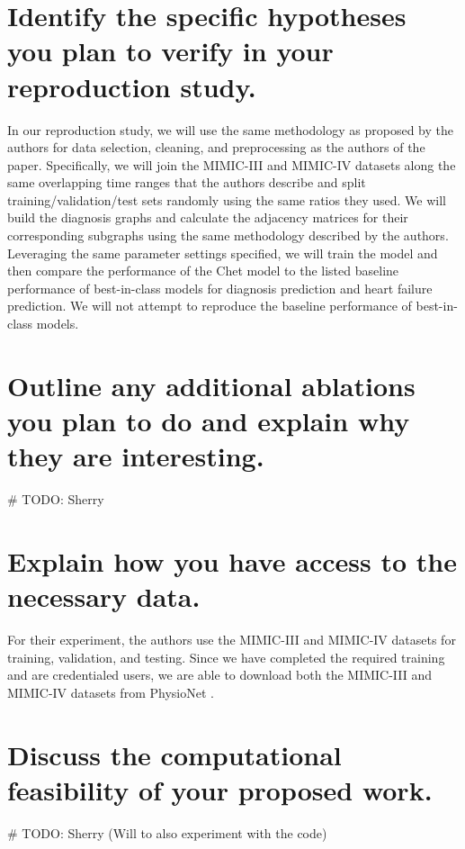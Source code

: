 \documentclass[11pt,a4paper]{article}
\begin{document}
\section{Identify the specific hypotheses you plan to verify in your
reproduction study.}
In our reproduction study, we will use the same methodology as proposed by the
authors for data selection, cleaning, and preprocessing as the authors of the
paper. Specifically, we will join the MIMIC-III and MIMIC-IV datasets along the
same overlapping time ranges that the authors describe and split
training/validation/test sets randomly using the same ratios they used. We will
build the diagnosis graphs and calculate the adjacency matrices for their
corresponding subgraphs using the same methodology described by the authors.
Leveraging the same parameter settings specified, we will train the model and
then compare the performance of the Chet model to the listed
baseline performance of best-in-class models for diagnosis prediction and heart
failure prediction. We will not attempt to reproduce the baseline performance of
best-in-class models.

\section{Outline any additional ablations you plan to do and
explain why they are interesting.}
\# TODO: Sherry

\section{Explain how you have access to the necessary data.}
For their experiment, the authors use the MIMIC-III \cite{mimic3} and MIMIC-IV
\cite{mimic4} datasets for training, validation, and testing. Since we have
completed the required training and are credentialed users, we are able to
download both the MIMIC-III and MIMIC-IV datasets from PhysioNet
\cite{physionet}.

\section{Discuss the computational feasibility of your proposed work.}
\# TODO: Sherry (Will to also experiment with the code)
\end{document}
